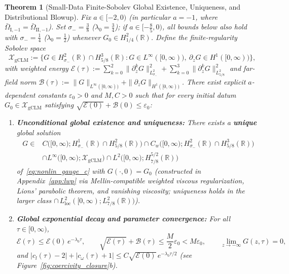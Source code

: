 \documentclass[11pt,a4paper]{article}
\newtheorem{thm}{Theorem}
\begin{document}
\begin{thm}[Small-Data Finite-Sobolev Global Existence, Uniqueness, and Distributional Blowup]\label{thm:nonlinear}
Fix $a \in [-2, 0)$ (in particular $a = -1$, where $\bar\Omega_{\mathrm{I},-1} = \bar\Omega_{\mathrm{II},-1}$). Set $\sigma_- = \frac{3}{8}$ ($\lambda_0 = \frac{3}{4}$); if $a \in [-\frac{8}{5}, 0)$, all bounds below also hold with $\sigma_- = \frac{1}{4}$ ($\lambda_0 = \frac{1}{2}$) whenever $G_0 \in H^2_{1/4}(\mathbb{R})$. Define the finite-regularity Sobolev space
\[
\mathcal{X}_{\mathrm{gCLM}} := \Big\{G \in H^2_{\sigma_-}(\mathbb{R}) \cap H^3_{5/8}(\mathbb{R}) : G \in L^\infty([0,\infty)),\ \partial_z G \in H^1([0,\infty))\Big\},
\]
with weighted energy $\mathcal{E}(\tau) := \sum_{k=0}^2\|\partial_z^k G\|_{L^2_{\sigma_-}}^2 + \sum_{k=0}^3\|\partial_z^k G\|_{L^2_{5/8}}^2$ and far-field norm $\mathcal{B}(\tau) := \|G\|_{L^\infty([0,\infty))} + \|\partial_z G\|_{H^1([0,\infty))}$. There exist explicit $a$-dependent constants $\varepsilon_0 > 0$ and $M, C > 0$ such that for every initial datum $G_0 \in \mathcal{X}_{\mathrm{gCLM}}$ satisfying $\sqrt{\mathcal{E}(0)} + \mathcal{B}(0) \le \varepsilon_0$:
\begin{enumerate}
  \item \textbf{Unconditional global existence and uniqueness:} There exists a \textbf{unique} global solution
  \[
  \begin{aligned}
  G \in{} &C\big([0,\infty); H^1_{\sigma_-}(\mathbb{R}) \cap H^2_{5/8}(\mathbb{R})\big) \cap C_w\big([0,\infty); H^2_{\sigma_-}(\mathbb{R}) \cap H^3_{5/8}(\mathbb{R})\big) \\
          &\cap L^\infty\big([0,\infty); \mathcal{X}_{\mathrm{gCLM}}\big) \cap L^2\big([0,\infty); H^{5/2}_{7/8}(\mathbb{R})\big)
  \end{aligned}
  \]
  of~\eqref{eq:nonlin_gauge_c} with $G(\cdot,0) = G_0$ (constructed in Appendix~\ref{app:lwp} via Mellin-compatible weighted viscous regularization, Lions' parabolic theorem, and vanishing viscosity; uniqueness holds in the larger class $\cap\,L^2_{\mathrm{loc}}([0,\infty); L^2_{7/8}(\mathbb{R}))$).
  \item \textbf{Global exponential decay and parameter convergence:} For all $\tau \in [0,\infty)$,
  \[
  \mathcal{E}(\tau) \le \mathcal{E}(0)\,e^{-\lambda_0\tau}, \qquad \sqrt{\mathcal{E}(\tau)} + \mathcal{B}(\tau) \le \frac{M}{2}\varepsilon_0 < M\varepsilon_0, \qquad \lim_{z\to-\infty}G(z,\tau) = 0,
  \]
  and $|c_l(\tau) - 2| + |c_\omega(\tau) + 1| \le C\sqrt{\mathcal{E}(0)}\,e^{-\lambda_0\tau/2}$ (see Figure~\ref{fig:coercivity_closure}b).

\end{enumerate}
\end{thm}
\end{document}
